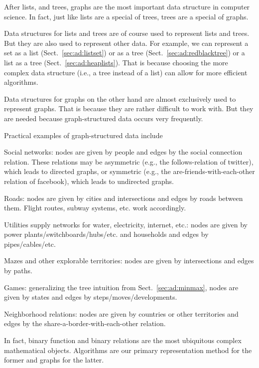 After lists, and trees, graphs are the most important data structure in computer science.
In fact, just like lists are a special of trees, trees are a special of graphs.

Data structures for lists and trees are of course used to represent lists and trees.
But they are also used to represent other data.
For example, we can represent a set as a list (Sect.~\ref{sec:ad:listset}) or as a tree (Sect.~\ref{sec:ad:redblacktree}) or a list as a tree (Sect.~\ref{sec:ad:heaplists}).
That is because choosing the more complex data structure (i.e., a tree instead of a list) can allow for more efficient algorithms.

Data structures for graphs on the other hand are almost exclusively used to represent graphs.
That is because they are rather difficult to work with.
But they are needed because graph-structured data occurs very frequently.

Practical examples of graph-structured data include
\begin{compactitem}
 \item Social networks: nodes are given by people and edges by the social connection relation.
  These relations may be asymmetric (e.g., the follows-relation of twitter), which leads to directed graphs, or symmetric (e.g., the are-friends-with-each-other relation of facebook), which leads to undirected graphs.
 \item Roads: nodes are given by cities and intersections and edges by roads between them. Flight routes, subway systems, etc. work accordingly.
 \item Utilities supply networks for water, electricity, internet, etc.: nodes are given by power plants/switchboards/hubs/etc. and households and edges by pipes/cables/etc.
 \item Mazes and other explorable territories: nodes are given by intersections and edges by paths.
 \item Games: generalizing the tree intuition from Sect.~\ref{sec:ad:minmax}, nodes are given by states and edges by steps/moves/developments.
 \item Neighborhood relations: nodes are given by countries or other territories and edges by the share-a-border-with-each-other relation.
\end{compactitem}

In fact, binary function and binary relations are the most ubiquitous complex mathematical objects.
Algorithms are our primary representation method for the former and graphs for the latter.

